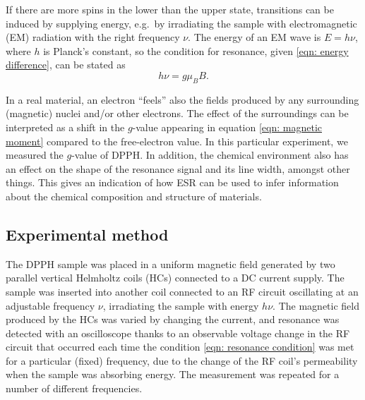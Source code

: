 \documentclass[a4paper]{jpconf}
\numberwithin{equation}{section}
\begin{document}
If there are more spins in the lower than the upper state, transitions can be induced by supplying energy, e.g.\ by irradiating the sample with electromagnetic (EM) radiation with the right frequency $\nu$. The energy of an EM wave is $E = h \nu$, where $h$ is Planck's constant, so the condition for resonance, given \eqref{eqn: energy difference}, can be stated as
\begin{equation}
	h\nu = g\mu_B B. \label{eqn: resonance condition}
\end{equation}

In a real material, an electron ``feels'' also the fields produced by any surrounding (magnetic) nuclei and/or other electrons. The effect of the surroundings can be interpreted as a shift in the $g$-value appearing in equation \eqref{eqn: magnetic moment} compared to the free-electron value. In this particular experiment, we measured the $g$-value of DPPH. In addition, the chemical environment also has an effect on the shape of the resonance signal and its line width, amongst other things. This gives an indication of how ESR can be used to infer information about the chemical composition and structure of materials. 

\subsection{Experimental method}\label{section: method}
The DPPH sample was placed in a uniform magnetic field generated by two parallel vertical Helmholtz coils (HCs) connected to a DC current supply. The sample was inserted into another coil connected to an RF circuit oscillating at an adjustable frequency $\nu$, irradiating the sample with energy $h\nu$. The magnetic field produced by the HCs was varied by changing the current, and resonance was detected with an oscilloscope thanks to an observable voltage change in the RF circuit that occurred each time the condition \eqref{eqn: resonance condition} was met for a particular (fixed) frequency, due to the change of the RF coil's permeability when the sample was absorbing energy. The measurement was repeated for a number of different frequencies.  
\end{document}
